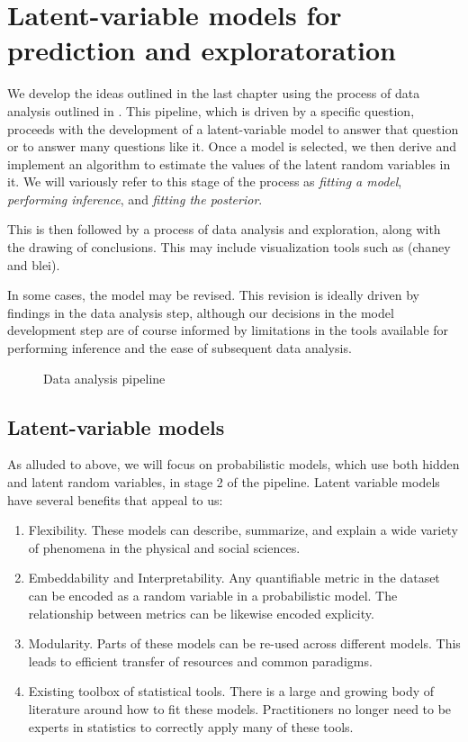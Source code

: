 \section{Latent-variable models for prediction and exploratoration}
  \label{section:pipeline}
  We develop the ideas outlined in the last chapter using the process
  of data analysis outlined in .  This
  pipeline, which is driven by a specific question, proceeds with the
  development of a latent-variable model to answer that question or to
  answer many questions like it.  Once a model is selected, we then
  derive and implement an algorithm to estimate the values of the
  latent random variables in it.  We will variously refer to this
  stage of the process as \emph{fitting a model}, \emph{performing
    inference}, and \emph{fitting the posterior}.

  This is then followed by a process of data analysis and exploration,
  along with the drawing of conclusions.  This may include
  visualization tools such as \cite{chaney:2012}(chaney and blei).

  In some cases, the model may be revised.  This revision is ideally
  driven by findings in the data analysis step, although our decisions
  in the model development step are of course informed by limitations
  in the tools available for performing inference and the ease of
  subsequent data analysis.

  \begin{figure}
    \caption{Data analysis pipeline}
    \label{figure:data_analysis_pipeline}
  \end{figure}
  
  \subsection{Latent-variable models}

  As alluded to above, we will focus on probabilistic models, which
  use both hidden and latent random variables, in stage 2 of the
  pipeline.  Latent variable models have several benefits that appeal
  to us:
  \begin{enumerate}
    \item Flexibility. These models can describe, summarize, and explain
    a wide variety of phenomena in the physical and social sciences.
    \item Embeddability and Interpretability.  Any quantifiable metric in the dataset
      can be encoded as a random variable in a probabilistic model.
      The relationship between metrics can be likewise encoded
      explicity. \label{lvm:matching}
    \item Modularity. Parts of these models can be re-used across
      different models.  This leads to efficient transfer of resources
      and common paradigms.
    \item Existing toolbox of statistical tools. There is a large and
      growing body of literature around how to fit these models.
      Practitioners no longer need to be experts in statistics to
      correctly apply many of these tools.
  \end{enumerate}

